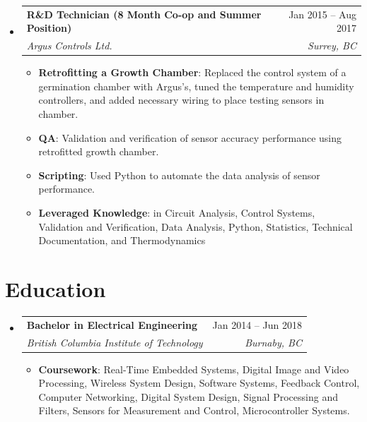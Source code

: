 \documentclass[letterpaper,10pt]{article}
\makeatletter
\newcommand{\resumeItem}[2]{
    \item\small{
    \textbf{#1}{: #2 \vspace{-2pt}}
  }
}
\newcommand{\ResumeSubheading}[4]{
  \vspace{-1pt}\item
    \begin{tabular*}{\textwidth}[t]{l@{\extracolsep{\fill}}r}
      \textbf{#1} & #2 \\
      \textit{\small#3} & \textit{\small #4} \\
    \end{tabular*}
  \vspace{-5pt}
}
\newenvironment{SubheadingList}
  {\begin{itemize}[label=,leftmargin=0em]}
  {\end{itemize}}
\newenvironment{ItemList}
  {\begin{itemize}[label=,leftmargin=1em]}
  {\end{itemize}\vspace{-5pt}}
\makeatother
\begin{document}
\begin{SubheadingList}
  \ResumeSubheading
    {R\&D Technician (8 Month Co-op and Summer Position)}{Jan 2015 -- Aug 2017}
    {Argus Controls Ltd.}{Surrey, BC}
  \begin{ItemList}
    \resumeItem{Retrofitting a Growth Chamber}
      {Replaced the control system of a germination chamber with Argus's, tuned
      the temperature and humidity controllers, and added necessary wiring to
      place testing sensors in chamber.}
    \resumeItem{QA}
      {Validation and verification of sensor accuracy performance using
      retrofitted growth chamber.}
    \resumeItem{Scripting}
      {Used Python to automate the data analysis of sensor performance.}
    \resumeItem{Leveraged Knowledge}
    {in Circuit Analysis, Control Systems, Validation and Verification, Data
    Analysis, Python, Statistics, Technical Documentation, and Thermodynamics}
  \end{ItemList}
\end{SubheadingList}

\section{Education}
\begin{SubheadingList}
  \ResumeSubheading
    {Bachelor in Electrical Engineering}{Jan 2014 -- Jun 2018}
    {British Columbia Institute of Technology}{Burnaby, BC}
  \begin{ItemList}
    \resumeItem{Coursework}
    {Real-Time Embedded Systems, Digital Image and Video Processing, Wireless
    System Design, Software Systems, Feedback Control, Computer Networking,
    Digital System Design, Signal Processing and Filters, Sensors for
    Measurement and Control, Microcontroller Systems.}
  \end{ItemList}
\end{SubheadingList}

\end{document}
